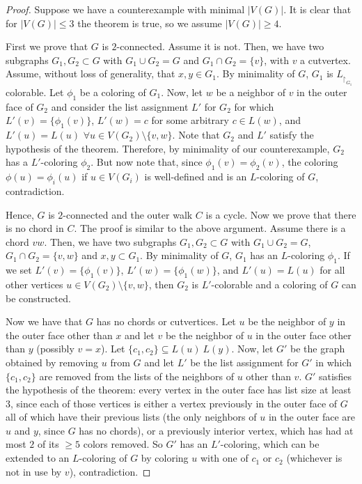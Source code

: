 \begin{proof}
Suppose we have a counterexample with minimal $|V(G)|$. It is clear that for 
$|V(G)| \leq 3$ the theorem is true, so we assume $|V(G)| \geq 4$.

First we prove that $G$ is $2$-connected. Assume it is not. Then, we have two subgraphs $G_1, G_2 \subset G$ with $G_1 \cup G_2 = G$ 
and $G_1 \cap G_2 = \{v\}$, with $v$ a cutvertex. Assume, without loss of generality, that $x, y \in G_1$. By minimality of $G$, 
$G_1$ is $L_{\restriction_{G_1}}$ colorable. Let $\phi_1$ be a coloring of $G_1$. Now, let $w$ be a neighbor of $v$ in the outer face 
of $G_2$ and consider the list assignment $L'$ for $G_2$ for which $L'(v) = \{\phi_1(v)\}$, $L'(w) = c$ for some arbitrary 
$c \in L(w)$, and $L'(u) = L(u)$ $\forall u \in V(G_2) \setminus \{v, w\}$. Note that $G_2$ and $L'$ satisfy the hypothesis 
of the theorem. Therefore, by minimality of our counterexample, $G_2$ has a $L'$-coloring $\phi_2$. But now note that, since 
$\phi_1(v) = \phi_2(v)$, the coloring $\phi(u) = \phi_i(u)$ if $u \in V(G_i)$ is well-defined and is an $L$-coloring of $G$, 
contradiction.

Hence, $G$ is $2$-connected and the outer walk $C$ is a cycle. Now we prove that there is no chord in $C$. The proof is 
similar to the above argument. Assume there is a chord $vw$. Then, we have two subgraphs $G_1, G_2 \subset G$ with 
$G_1 \cup G_2 = G$, $G_1 \cap G_2 = \{v, w\}$ and ${x, y} \subset G_1$. By minimality of $G$, $G_1$ has an $L$-coloring $\phi_1$. 
If we set $L'(v) = \{\phi_1(v)\}$, $L'(w) = \{\phi_1(w)\}$, and $L'(u) = L(u)$ for all other vertices 
$u \in V(G_2) \setminus \{v, w\}$, then $G_2$ is $L'$-colorable and a coloring of $G$ can be constructed.

Now we have that $G$ has no chords or cutvertices. Let $u$ be the neighbor of $y$ in the outer face other than 
$x$ and let $v$ be the neighbor of $u$ in the outer face other than $y$ (possibly $v = x$). Let  
$\{c_1, c_2\} \subseteq L(u) \ L(y)$. Now, let $G'$ be the graph obtained by removing $u$ from $G$ and let $L'$ be 
the list assignment for $G'$ in which $\{c_1, c_2\}$ are removed from the lists of the neighbors of $u$ other than 
$v$. $G'$ satisfies the hypothesis of the theorem: every vertex in the outer face has list size at least $3$, since each of those
vertices is
either a vertex previously in the outer face of $G$ all of which have their previous lists (the only neighbors of $u$ in 
the outer face are $u$ and $y$, since $G$ has no chords), or a previously interior vertex, which has had at most $2$ of its
$\geq 5$ colors removed. So $G'$ has an $L'$-coloring, which can be extended to an $L$-coloring of $G$ by coloring $u$ with one
of $c_1$ or $c_2$ (whichever is not in use by $v$), contradiction.



\end{proof}
